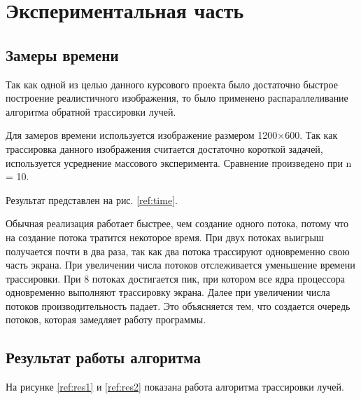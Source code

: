 \chapter{Экспериментальная часть}

\section{Замеры времени}

Так как одной из целью данного курсового проекта было достаточно быстрое
построение реалистичного изображения, то было применено распараллеливание
алгоритма обратной трассировки лучей.

Для замеров времени используется изображение размером 1200$\times$600.
Так как трассировка данного изображения считается достаточно короткой
задачей, используется усреднение массового эксперимента.
Сравнение произведено при n = 10.

Результат представлен на рис. \ref{ref:time}.

\begin{figure}[ht!]
\end{figure}

\newpage

Обычная реализация работает быстрее, чем создание одного потока,
потому что на создание потока тратится некоторое время.
При двух потоках выигрыш получается почти в два раза, так как два потока
трассируют одновременно свою часть экрана.
При увеличении числа потоков отслеживается уменьшение времени трассировки.
При 8 потоках достигается пик, при котором все ядра процессора одновременно
выполняют трассировку экрана.
Далее при увеличении числа потоков производительность падает.
Это объясняется тем, что создается очередь потоков, которая замедляет
работу программы.

\section{Результат работы алгоритма}

На рисунке \ref{ref:res1} и \ref{ref:res2} показана работа алгоритма
трассировки лучей.

\begin{figure}[ht!]
\end{figure}

